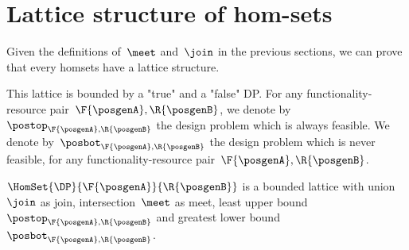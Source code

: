 \section{Lattice structure of \DP hom-sets}

Given the definitions of~$\meet$ and~$\join$ in the previous sections, we can prove that every \DP homsets have a lattice structure.

This lattice is bounded by a "true" and a "false" DP.
For any functionality-resource pair~$\F{\posgenA},\R{\posgenB}$, we denote by~$\postop_{\F{\posgenA},\R{\posgenB}}$ the design problem which is always feasible.
We denote by~$\posbot_{\F{\posgenA},\R{\posgenB}}$ the design problem which is never feasible, for any functionality-resource pair~$\F{\posgenA},\R{\posgenB}$.

\begin{lemma}
	\label{lem:dpboundedlattice}
	$\HomSet{\DP}{\F{\posgenA}}{\R{\posgenB}}$ is a bounded lattice with union~$\join$ as join, intersection~$\meet$ as meet, least upper bound~$\postop_{\F{\posgenA},\R{\posgenB}}$ and greatest lower bound~$\posbot_{\F{\posgenA},\R{\posgenB}}$.
\end{lemma}

